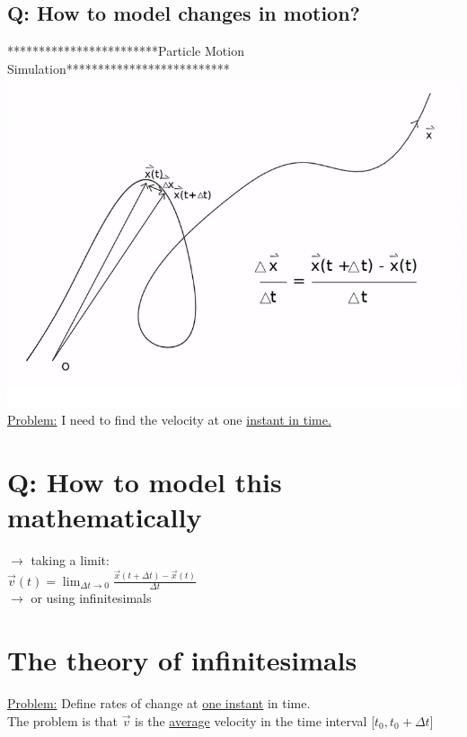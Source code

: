 \documentclass[a4paper, 12pt]{article}
\begin{document}
\subsection{Q: How to model changes in motion?}
************************Particle Motion Simulation**************************\\
\includegraphics[scale=0.7]{Particle Motion Simulation}\\
\underline{Problem:} I need to find the velocity at one \underline{instant in time.}

\section{Q: How to model this mathematically}
$\rightarrow$ taking a limit:\\
$\vec{v}(t) = \displaystyle\lim_{\Delta t\to 0} \frac{\vec{x}(t+\Delta t) - \vec{x}(t)}{\Delta t}$\\
$\rightarrow$ or using infinitesimals

\section{The theory of infinitesimals}
\underline{Problem:} Define rates of change at \underline{one instant} in time.\\
The problem is that $\vec{v}$ is the \underline{average} velocity in the time interval [$t_0,t_0+\Delta t$]\\
\end{document}
